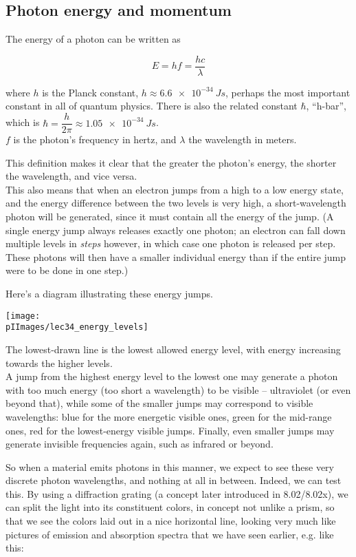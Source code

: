 \subsection{Photon energy and momentum}

The energy of a photon can be written as

\begin{equation}
E = h f = \frac{h c}{\lambda}
\end{equation}

where $h$ is the Planck constant, $h \approx \SI{6.6e-34}{J s}$, perhaps the most important constant in all of quantum physics. There is also the related constant $\hbar$, ``h-bar'', which is $\hbar = \dfrac{h}{2\pi} \approx \SI{1.05e-34}{J s}$.\\
$f$ is the photon's frequency in hertz, and $\lambda$ the wavelength in meters.

This definition makes it clear that the greater the photon's energy, the shorter the wavelength, and vice versa.\\
This also means that when an electron jumps from a high to a low energy state, and the energy difference between the two levels is very high, a short-wavelength photon will be generated, since it must contain all the energy of the jump. (A single energy jump always releases exactly one photon; an electron can fall down multiple levels in \emph{steps} however, in which case one photon is released per step. These photons will then have a smaller individual energy than if the entire jump were to be done in one step.)

Here's a diagram illustrating these energy jumps.

\begin{center}
\texttt{[image: \\pIImages/lec34\_energy\_levels]}
\end{center}

The lowest-drawn line is the lowest allowed energy level, with energy increasing towards the higher levels.\\
A jump from the highest energy level to the lowest one may generate a photon with too much energy (too short a wavelength) to be visible -- ultraviolet (or even beyond that), while some of the smaller jumps may correspond to visible wavelengths: blue for the more energetic visible ones, green for the mid-range ones, red for the lowest-energy visible jumps. Finally, even smaller jumps may generate invisible frequencies again, such as infrared or beyond.

So when a material emits photons in this manner, we expect to see these very discrete photon wavelengths, and nothing at all in between. Indeed, we can test this. By using a diffraction grating (a concept later introduced in 8.02/8.02x), we can split the light into its constituent colors, in concept not unlike a prism, so that we see the colors laid out in a nice horizontal line, looking very much like pictures of emission and absorption spectra that we have seen earlier, e.g. like this:

